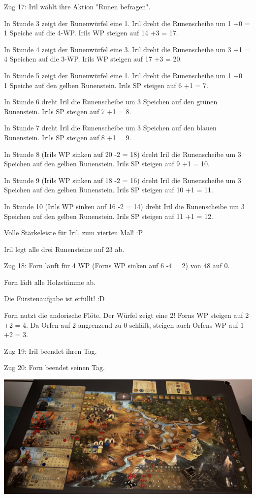 \documentclass[10pt, a4paper, oneside]{book}
\begin{document}
{Zug 17: Iril wählt ihre Aktion "Runen befragen".

In Stunde 3 zeigt der Runenwürfel eine 1. Iril dreht die Runenscheibe um 1 +0 = 1 Speiche auf die 4-WP. Irils WP steigen auf 14 +3 = 17.

In Stunde 4 zeigt der Runenwürfel eine 3. Iril dreht die Runenscheibe um 3 +1 = 4 Speichen auf die 3-WP. Irils WP steigen auf 17 +3 = 20.

In Stunde 5 zeigt der Runenwürfel eine 1. Iril dreht die Runenscheibe um 1 +0 = 1 Speiche auf den gelben Runenstein. Irils SP steigen auf 6 +1 = 7.

In Stunde 6 dreht Iril die Runenscheibe um 3 Speichen auf den grünen Runenstein. Irils SP steigen auf 7 +1 = 8.

In Stunde 7 dreht Iril die Runenscheibe um 3 Speichen auf den blauen Runenstein. Irils SP steigen auf 8 +1 = 9.

In Stunde 8 (Irils WP sinken auf 20 -2 = 18) dreht Iril die Runenscheibe um 3 Speichen auf den gelben Runenstein. Irils SP steigen auf 9 +1 = 10.

In Stunde 9 (Irils WP sinken auf 18 -2 = 16) dreht Iril die Runenscheibe um 3 Speichen auf den gelben Runenstein. Irils SP steigen auf 10 +1 = 11.

In Stunde 10 (Irils WP sinken auf 16 -2 = 14) dreht Iril die Runenscheibe um 3 Speichen auf den gelben Runenstein. Irils SP steigen auf 11 +1 = 12.

Volle Stärkeleiste für Iril, zum vierten Mal! :P

Iril legt alle drei Runensteine auf 23 ab.



Zug 18: Forn läuft für 4 WP (Forns WP sinken auf 6 -4 = 2) von 48 auf 0.

Forn lädt alle Holzstämme ab.

Die Fürstenaufgabe ist erfüllt! :D

Forn nutzt die andorische Flöte. Der Würfel zeigt eine 2! Forns WP steigen auf 2 +2 = 4. Da Orfen auf 2 angrenzend zu 0 schläft, steigen auch Orfens WP auf 1 +2 = 3.



Zug 19: Iril beendet ihren Tag.



Zug 20: Forn beendet seinen Tag.\bigskip





\includegraphics[width=\textwidth]{Das Erbe des Wunderkindes/Bilder/Tag 2 Ende.jpg}

}
\end{document}
